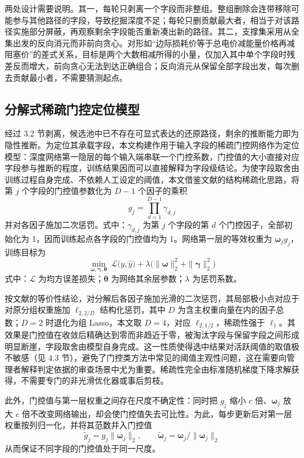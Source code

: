 \documentclass[UTF8,zihao=5,twoside]{ctexart}
\begin{document}
两处设计需要说明。其一，每轮只剥离一个字段而非整组。整组删除会连带移除可能参与其他路径的字段，导致挖掘深度不足；每轮只删贡献最大者，相当于对该路径实施部分屏蔽，再观察剩余字段能否重新凑出新的路径。其二，支撑集采用从全集出发的反向消元而非前向贪心。对形如“边际损耗价等于总电价减能量价格再减阻塞价”的差式关系，目标是两个大数相减所得的小量，仅加入其中单个字段时残差反而增大，前向贪心无法到达正确组合；反向消元从保留全部字段出发，每次删去贡献最小者，不需要猜测起点。

\subsection{分解式稀疏门控定位模型}

经过 3.2 节剥离，候选池中已不存在可显式表达的还原路径，剩余的推断能力即为隐性推断。为定位其承载字段，本文构建作用于输入字段的稀疏门控网络作为定位模型：深度网络第一隐层的每个输入端串联一个门控系数，门控值的大小直接对应字段参与推断的程度，训练结果因而可以直接解释为字段级结论。为使字段取舍由训练过程自身完成、不依赖人工设定的阈值，本文借鉴文献\cite{ref-dgating}的结构稀疏化思路，将第 $j$ 个字段的门控值参数化为 $D-1$ 个因子的乘积
\begin{equation}
g_j=\prod_{d=1}^{D-1}\gamma_{d,j}
\end{equation}
并对各因子施加二次惩罚。式中：$\gamma_{d,j}$ 为第 $j$ 个字段的第 $d$ 个门控因子，全部初始化为 1，因而训练起点各字段的门控值均为 1。网络第一层的等效权重为 $\bm{\omega}_j g_j$，训练目标为
\begin{equation}
\min_{\bm{\omega},\bm{\gamma},\bm{\theta}}\ \mathcal{L}\big(y,\hat y\big)
+\lambda\Big(\|\bm{\omega}\|_2^2+\|\bm{\gamma}\|_2^2\Big)
\end{equation}
式中：$\mathcal{L}$ 为均方误差损失；$\bm{\theta}$ 为网络其余层参数；$\lambda$ 为惩罚系数。

按文献\cite{ref-dgating}的等价性结论，对分解后各因子施加光滑的二次惩罚，其局部极小点对应于对原分组权重施加 $\ell_{2,2/D}$ 结构化惩罚，其中 $D$ 为含主权重向量在内的因子总数；$D=2$ 时退化为组 Lasso，本文取 $D=4$，对应 $\ell_{2,1/2}$，稀疏性强于 $\ell_1$。其效果是门控值在收敛后精确达到零而非趋近于零，被淘汰字段与保留字段之间形成明显断崖，字段取舍由模型自身完成。这一性质使得选中结果对活跃阈值的取值极不敏感（见 4.3 节），避免了门控类方法中常见的阈值主观性问题，这在需要向管理者解释判定依据的审查场景中尤为重要。稀疏性完全由标准随机梯度下降求解获得，不需要专门的非光滑优化器或事后剪枝。

此外，门控值与第一层权重之间存在尺度不确定性：同时把 $g_j$ 缩小 $c$ 倍、$\bm{\omega}_j$ 放大 $c$ 倍不改变网络输出，却会使门控值失去可比性。为此，每步更新后对第一层权重按列归一化，并将其范数并入门控值
\begin{equation}
\tilde g_j=g_j\|\bm{\omega}_j\|_2,\qquad
\tilde{\bm{\omega}}_j=\bm{\omega}_j/\|\bm{\omega}_j\|_2
\end{equation}
从而保证不同字段的门控值处于同一尺度。
\end{document}
